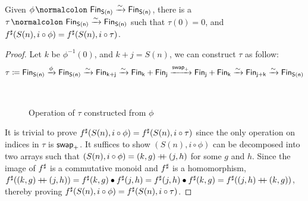 \begin{lemma}\label{bag:tau}
    Given $\phi\colon \Fin[S(n)]\xto{\sim}\Fin[S(n)]$, there is a $\tau\colon \Fin[S(n)]\xto{\sim}\Fin[S(n)]$
    such that $\tau(0) = 0$, and ${f}^{\sharp}(S(n), i \circ \phi) = {f}^{\sharp}(S(n), i \circ \tau)$.
\end{lemma}

\begin{proof}
    Let $k$ be $\phi^{-1}(0)$, and $k + j = S(n)$, we can construct $\tau$ as follow:
    \begin{align*}
        \tau \defeq \Fin[S(n)] \xto{\phi} \Fin[S(n)] \xto{\sim} \Fin[k+j] \xto{\sim} \Fin[k] + \Fin[j]
        \xto{\term{swap}_{+}} \Fin[j] + \Fin[k] \xto{\sim} \Fin[j+k] \xto{\sim} \Fin[S(n)]
    \end{align*}

    \begin{figure}[H]
        \centering
        \\
        \caption{Operation of $\tau$ constructed from $\phi$}
        \label{fig:enter-label}
    \end{figure}

    It is trivial to prove ${f}^{\sharp}(S(n), i \circ \phi) = {f}^{\sharp}(S(n), i \circ \tau)$ since the only
    operation on indices in $\tau$ is $\operatorname{\mathsf{swap}}_{+}$. It suffices to show $(S(n), i \circ \phi)$
    can be decomposed into two arrays such that $(S(n), i \circ \phi) = (k, g) \mathbin{+\kern -0.4em+} (j, h)$
    for some $g$ and $h$. Since the image of ${f}^{\sharp}$ is a commutative monoid and ${f}^{\sharp}$ is a homomorphism,
    ${f}^{\sharp}((k, g) \mathbin{+\kern -0.4em+} (j, h)) = {f}^{\sharp}(k, g) \mathbin{\bullet} {f}^{\sharp}(j, h) = {f}^{\sharp}(j, h) \mathbin{\bullet} {f}^{\sharp}(k, g) =
        {f}^{\sharp}((j, h) \mathbin{+\kern -0.4em+} (k, g))$, thereby proving ${f}^{\sharp}(S(n), i \circ \phi) = {f}^{\sharp}(S(n), i \circ \tau)$.

\end{proof}

